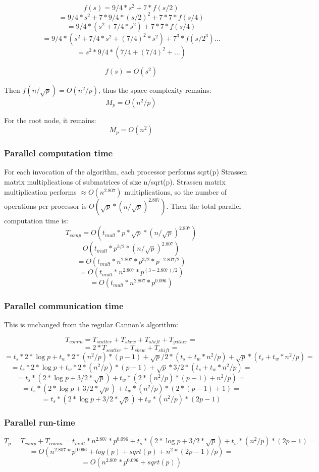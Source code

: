\documentclass{article}
\begin{document}
$$f(s) = 9/4*s^2 + 7*f(s/2)$$
$$= 9/4*s^2 + 7*9/4*(s/2)^2 + 7*7*f(s/4)$$
$$= 9/4*(s^2 + 7/4*s^2) + 7*7*f(s/4)$$
$$ = 9/4*( s^2 + 7/4*s^2 + (7/4)^2*s^2 ) +7^3*f(s/2^3) ... $$
$$ = s^2 * 9/4 * (7/4 + (7/4)^2 + \dots)$$
	
$$f(s) = O(s^2)$$

Then $f(n/\sqrt{p}) = O(n^2/p)$, thus the space complexity remains:
$$M_p = O(n^2/p)$$

For the root node, it remains:
$$M_p = O(n^2)$$


\subsubsection{Parallel computation time}

For each invocation of the algorithm, each processor performs sqrt(p) Strassen
matrix multiplications of submatrices of size n/sqrt(p). Strassen matrix
multiplication performs $\approx O(n^{2.807})$ multiplications, so the number of
operations per processor is $O(\sqrt{p}*(n/\sqrt{p})^{2.807})$. Then the total
parallel computation time is:
$$T_{{comp}} = O(t_{{mult}}*p*\sqrt{p}*(n/\sqrt{p})^{2.807})$$
$$O(t_{{mult}}*p^{3/2}*(n/\sqrt{p})^{2.807})$$
$$= O(t_{{mult}}*n^{2.807} * p^{3/2} * p^{-2.807/2}) $$
$$= O(t_{{mult}} * n^{2.807} * p^{(3-2.807)/2}) $$
$$= O(t_{{mult}} * n^{2.807} * p^{0.096})$$

\subsubsection{Parallel communication time}

This is unchanged from the regular Cannon's algorithm:

$$	T_{{comm}} = T_{{scatter}} + T_{{skew}} + T_{{shift}} + T_{{gather}} =$$
$$		= 2*T_{{scatter}} + T_{{skew}} + T_{{shift}} =$$
$$		= t_s*2*\log{p} + t_w*2*(n^2/p)*(p-1) + \sqrt{p}/2 * (t_s + t_w*n^2/p) + \sqrt{p}*(t_s + t_w*n^2/p) =$$
$$		= t_s*2*\log{p} + t_w*2*(n^2/p)*(p-1) + \sqrt{p}*3/2 * (t_s + t_w*n^2/p) =$$
$$		= t_s*(2*\log{p} + 3/2*\sqrt{p}) + t_w*(2*(n^2/p)*(p-1) + n^2/p) =$$
$$		= t_s*(2*\log{p} + 3/2*\sqrt{p}) + t_w*(n^2/p)*(2*(p-1) + 1) =$$
$$		= t_s*(2*\log{p} + 3/2*\sqrt{p}) + t_w*(n^2/p)*(2p-1)$$

\subsubsection{Parallel run-time}

$$T_p = T_{{comp}} + T_{{comm}} = t_{{mult}} * n^2.807 * p^0.096 + t_s*(2*\log{p} + 3/2*\sqrt{p}) + t_w*(n^2/p)*(2p-1) =$$
$$	= O(n^2.807 * p^0.096 + log(p) + sqrt(p) + n^2*(2p-1)/p) =$$
$$	= O(n^2.807 * p^0.096 + sqrt(p))$$
\end{document}
